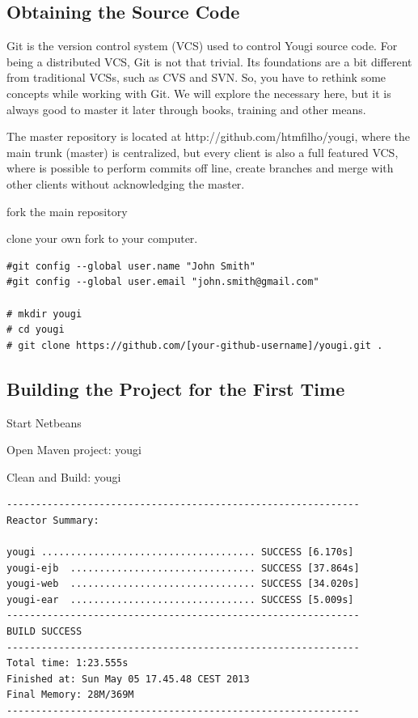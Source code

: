 \documentclass[envcountsame,envcountchap]{svmono}
\begin{document}
\subsection{Obtaining the Source Code}
\label{ssec:obtaining-source-code}

Git is the version control system (VCS) used to control Yougi source code. For being a distributed VCS, Git is not that trivial. Its foundations are a bit different from traditional VCSs, such as CVS and SVN. So, you have to rethink some concepts while working with Git. We will explore the necessary here, but it is always good to master it later through books, training and other means.

The master repository is located at http://github.com/htmfilho/yougi, where the main trunk (master) is centralized, but every client is also a full featured VCS, where is possible to perform commits off line, create branches and merge with other clients without acknowledging the master.

fork the main repository

clone your own fork to your computer.

\begin{verbatim}
#git config --global user.name "John Smith"
#git config --global user.email "john.smith@gmail.com"

# mkdir yougi
# cd yougi
# git clone https://github.com/[your-github-username]/yougi.git .
\end{verbatim}

\subsection{Building the Project for the First Time}

Start Netbeans

Open Maven project: yougi

Clean and Build: yougi

\begin{verbatim}
-------------------------------------------------------------
Reactor Summary:

yougi ..................................... SUCCESS [6.170s]
yougi-ejb  ................................ SUCCESS [37.864s]
yougi-web  ................................ SUCCESS [34.020s]
yougi-ear  ................................ SUCCESS [5.009s]
-------------------------------------------------------------
BUILD SUCCESS
-------------------------------------------------------------
Total time: 1:23.555s
Finished at: Sun May 05 17.45.48 CEST 2013
Final Memory: 28M/369M
-------------------------------------------------------------
\end{verbatim}
\end{document}
